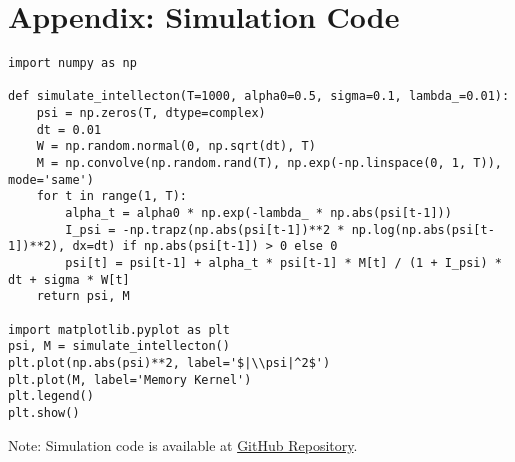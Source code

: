 \documentclass[11pt]{article}
\begin{document}
\section*{Appendix: Simulation Code}
\begin{lstlisting}
import numpy as np

def simulate_intellecton(T=1000, alpha0=0.5, sigma=0.1, lambda_=0.01):
    psi = np.zeros(T, dtype=complex)
    dt = 0.01
    W = np.random.normal(0, np.sqrt(dt), T)
    M = np.convolve(np.random.rand(T), np.exp(-np.linspace(0, 1, T)), mode='same')
    for t in range(1, T):
        alpha_t = alpha0 * np.exp(-lambda_ * np.abs(psi[t-1]))
        I_psi = -np.trapz(np.abs(psi[t-1])**2 * np.log(np.abs(psi[t-1])**2), dx=dt) if np.abs(psi[t-1]) > 0 else 0
        psi[t] = psi[t-1] + alpha_t * psi[t-1] * M[t] / (1 + I_psi) * dt + sigma * W[t]
    return psi, M

import matplotlib.pyplot as plt
psi, M = simulate_intellecton()
plt.plot(np.abs(psi)**2, label='$|\\psi|^2$')
plt.plot(M, label='Memory Kernel')
plt.legend()
plt.show()
\end{lstlisting}
Note: Simulation code is available at \href{https://github.com/EmpathicTech/IntellectonLattice}{GitHub Repository}.
\end{document}
